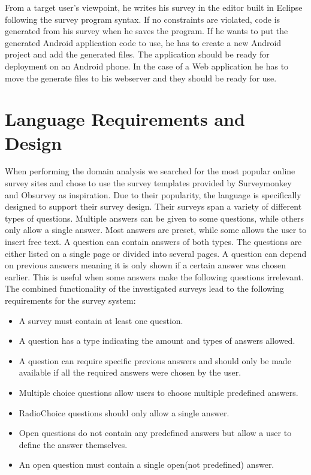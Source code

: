 \documentclass[runningheads]{llncs}
\begin{document}
From a target user's viewpoint, he writes his survey in the editor built in Eclipse following the survey program syntax. If no constraints are violated, code is generated from his survey when he saves the program. If he wants to put the generated Android application code to use, he has to create a new Android project and add the generated files. The application should be ready for deployment on an Android phone. In the case of a Web application he has to move the generate files to his webserver and they should be ready for use.

\section{Language Requirements and Design}
When performing the domain analysis we searched for the most popular online survey sites and chose to use the survey templates provided by Surveymonkey \cite{surveymonkey} and Obsurvey \cite{obsurvey} as inspiration. Due to their popularity, the language is specifically designed to support their survey design. Their surveys span a variety of different types of questions. Multiple answers can be given to some questions, while others only allow a single answer. Most answers are preset, while some allows the user to insert free text. A question can contain answers of both types. The questions are either listed on a single page or divided into several pages. A question can depend on previous answers meaning it is only shown if a certain answer was chosen earlier. This is useful when some answers make the following questions irrelevant. The combined functionality of the investigated surveys lead to the following requirements for the survey system:
\begin{itemize}
\item  A survey must contain at least one question. 
\item A question has a type indicating the amount and types of answers allowed. 
\item A question can require specific previous answers and should only be made available if all the required answers were chosen by the user. 
\item Multiple choice questions allow users to choose multiple predefined answers.
\item RadioChoice questions should only allow a single answer. 
\item Open questions do not contain any predefined answers but allow a user to define the answer themselves. 
\item An open question must contain a single open(not predefined) answer.
\end{itemize}
\end{document}
